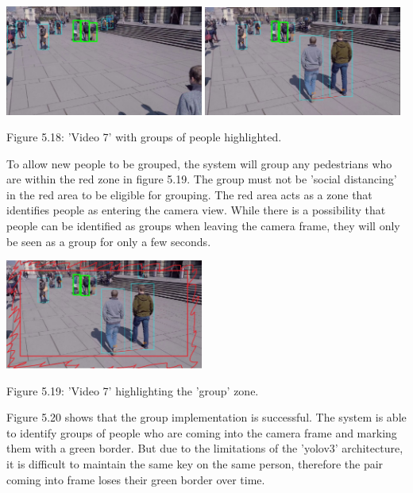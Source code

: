 \documentclass[12pt]{report}
\begin{document}
\begin{center}
	\includegraphics[width=65mm]{./images/appendix/Groups1.JPG}
	\includegraphics[width=65mm]{./images/appendix/Groups2.JPG}
	
	{\footnotesize Figure 5.18: 'Video 7' with groups of people highlighted.}
\end{center}

To allow new people to be grouped, the system will group any pedestrians who are within the red zone in figure 5.19. The group must not be 'social distancing' in the red area to be eligible for grouping. The red area acts as a zone that identifies people as entering the camera view. While there is a possibility that people can be identified as groups when leaving the camera frame, they will only be seen as a group for only a few seconds.

\begin{center}
	\includegraphics[width=65mm]{./images/appendix/GroupZone.JPG}
	
	{\footnotesize Figure 5.19: 'Video 7' highlighting the 'group' zone.}
\end{center}

Figure 5.20 shows that the group implementation is successful. The system is able to identify groups of people who are coming into the camera frame and marking them with a green border. But due to the limitations of the 'yolov3' architecture, it is difficult to maintain the same key on the same person, therefore the pair coming into frame loses their green border over time.  
\end{document}
